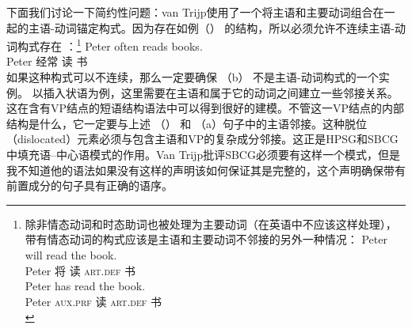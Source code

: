 下面我们讨论一下简约性问题：van Trijp使用了一个将主语和主要动词组合在一起的主语-动词锚定构式。因为存在如例（） 的结构，所以必须允许不连续主语-动词构式存在 ：\footnote{%
除非情态动词和时态助词也被处理为主要动词（在英语中不应该这样处理），带有情态动词的构式应该是主语和主要动词不邻接的另外一种情况：
  \eal
  \ex 
\gll Peter will read the book.\\
    Peter 将 读 \textsc{art}.\textsc{def} 书\\
  \ex 
\gll Peter has read the book.\\
    Peter \textsc{aux}.\textsc{prf} 读 \textsc{art}.\textsc{def} 书\\
  \zllast
} 
\ea
\gll Peter often reads books.\\
     Peter 经常 读 书\\
\z
如果这种构式可以不连续，那么一定要确保 （b） 不是主语-动词构式的一个实例。
\eal
{}
\zl
以插入状语为例，这里需要在主语和属于它的动词之间建立一些邻接关系。这在含有VP结点的短语结构语法中可以得到很好的建模。不管这一VP结点的内部结构是什么，它一定要与上述  （） 和 （a）句子中的主语邻接。这种脱位（dislocated）元素必须与包含主语和VP的复杂成分邻接。这正是HPSG和SBCG中填充语--中心语模式的作用。Van Trijp批评SBCG必须要有这样一个模式，但是我不知道他的语法如果没有这样的声明该如何保证其是完整的，这个声明确保带有前置成分的句子具有正确的语序。

